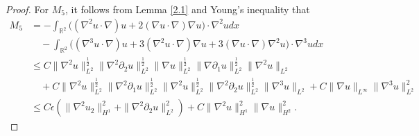 \documentclass[reqno,11pt]{amsart}
\def\R{\mathbb R}
\numberwithin{Thm}{section}
\begin{document}
\begin{proof}
For $M_5$, it follows from Lemma \ref{2.1} and Young's inequality that
\begin{align*}
M_5&=-\int_{\R^2}\big((\nabla^2u\cdot\nabla) u+2(\nabla u\cdot\nabla)\nabla u\big)\cdot\nabla^2udx\nonumber\\&\quad-\int_{\R^2}\big((\nabla^3u\cdot\nabla) u+3(\nabla^2u\cdot\nabla)\nabla u+3(\nabla u\cdot\nabla)\nabla^2 u\big)\cdot\nabla^3udx
\nonumber\\&\leq C\|\nabla^2u\|_{L^2}^{\frac{1}{2}}\|\nabla^2\partial_{2}u\|_{L^2}^{\frac{1}{2}}\|\nabla u\|_{L^2}^{\frac{1}{2}}\|\nabla\partial_{1}u\|_{L^2}^{\frac{1}{2}}\|\nabla^2u\|_{L^2}\nonumber\\&\quad+C\|\nabla^2u\|_{L^2}^{\frac{1}{2}}\|\nabla^2\partial_{1}u\|_{L^2}^{\frac{1}{2}}
\|\nabla^2 u\|_{L^2}^{\frac{1}{2}}\|\nabla^2\partial_{2} u\|_{L^2}^{\frac{1}{2}}\|\nabla^3u\|_{L^2}+C\|\nabla u\|_{L^{\infty}}\|\nabla^3u\|_{L^2}^2\nonumber\\&
\leq C\epsilon(\|\nabla^2 u_2\|_{H^{1}}^2+\|\nabla^2\partial_2 u\|_{L^{2}}^2)+C\|\nabla^2 u\|_{H^{1}}^2\|\nabla u\|_{H^{2}}^2.
\end{align*}





\end{proof}
\end{document}
